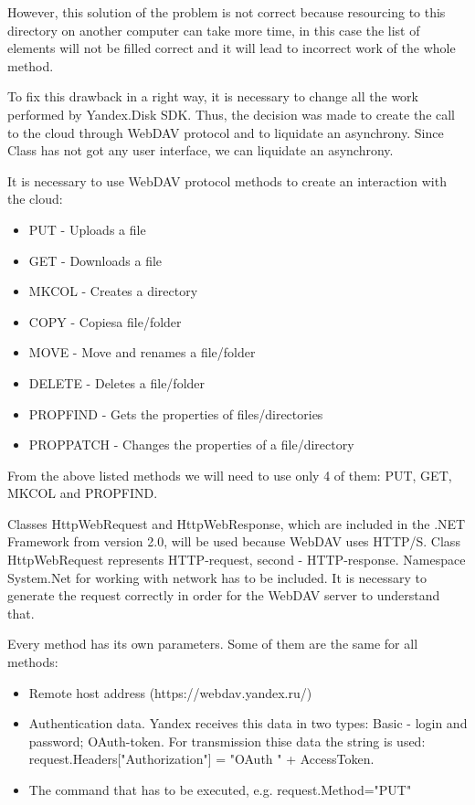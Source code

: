 \documentclass[12pt,journal,compsoc]{D:/Магистратура/English/bare_conf/IEEEtran}
\begin{document}
However, this solution of the problem is not correct because resourcing to this directory on another computer can take more time, in this case the list of elements will not be filled correct and it will lead to incorrect work of the whole method.

To fix this drawback in a right way,  it is necessary to change all the work performed by Yandex.Disk SDK. Thus, the decision was made to create the call to the cloud through WebDAV protocol and to liquidate an asynchrony. Since Class has not got any user interface, we can liquidate an asynchrony.

It is necessary to use WebDAV protocol methods to create an interaction with the cloud:
\begin{itemize}
\item PUT - Uploads a file
\item GET - Downloads a file
\item MKCOL - Creates a directory
\item COPY - Copiesa file/folder
\item MOVE - Move and renames a file/folder
\item DELETE - Deletes a file/folder
\item PROPFIND - Gets the properties of files/directories
\item PROPPATCH - Changes the properties of a file/directory

\end{itemize}

From the above listed methods we will need to use only 4 of them: PUT, GET, MKCOL and PROPFIND.

Classes HttpWebRequest and HttpWebResponse, which are included in the .NET Framework from version 2.0, will be used because WebDAV uses HTTP/S. Class HttpWebRequest represents HTTP-request, second - HTTP-response. Namespace System.Net for working with network has to be included. It is necessary to generate the request correctly in order for the WebDAV server to understand that.

Every method has its own parameters. Some of them are the same for all methods:
\begin{itemize}
\item Remote host address (https://webdav.yandex.ru/)
\item Authentication data. Yandex receives this data in two types: Basic - login and password; OAuth-token. For transmission thise data the string is used: request.Headers["Authorization"] = "OAuth " + AccessToken.
\item The command that has to be executed, e.g. request.Method="PUT"
\end{itemize}
\end{document}
